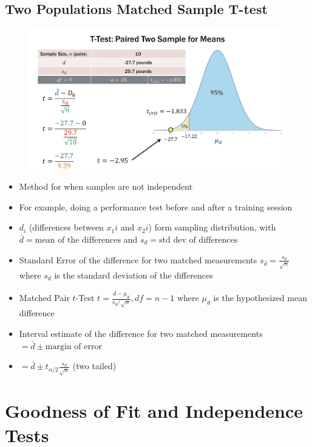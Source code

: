 \documentclass{article}
\begin{document}
\subsection{Two Populations Matched Sample T-test}

\begin{figure}[H]
        \centering
        \includegraphics[width=1\linewidth]{images/matchedtexample.png}
    \end{figure}

\begin{itemize}
    \item Method for when samples are not independent
    \item For example, doing a performance test before and after a training session
    \item $d_i$ (differences between $x_1i$ and $x_2i$) form sampling distribution, with $\bar{d}=\text{mean of the differences}$ and $s_d=\text{std dev of differences}$ 
    \item Standard Error of the difference for two matched measurements $s_{\bar{d}}=\frac{s_d}{\sqrt{n}}$ where $s_d$ is the standard deviation of the differences
    \item Matched Pair $t$-Test $t=\frac{\bar{d}-\mu_d}{s_d/\sqrt{n}}, df=n-1$ where $\mu_d$ is the hypothesized mean difference
    \item Interval estimate of the difference for two matched measurements $=\bar{d} \pm \text{margin of error}$
    \item $=\bar{d} \pm t_{\alpha/2} \frac{s_d}{\sqrt{n}}$ (two tailed)
\end{itemize}

\section{Goodness of Fit and Independence Tests}
\end{document}
